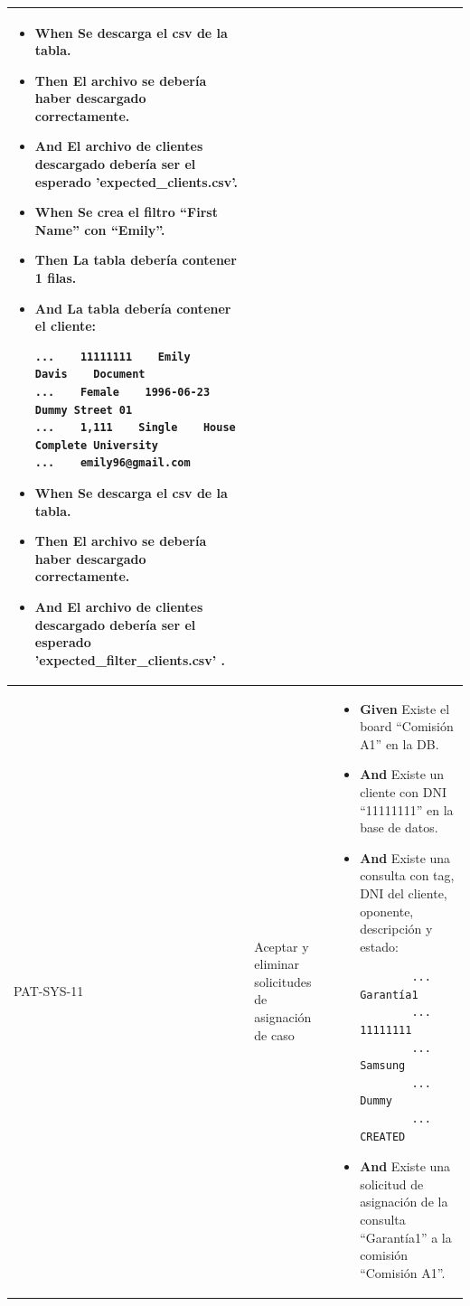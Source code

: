 \begin{longtable}{|p{1cm}|p{2.5cm}|p{12cm}|}
\begin{itemize}
\begin{verbatim}
...    22145685    John    Davis    Document    Female
...    1980-06-25  Dummy Street 01    1,111    Single
...    House  Complete University   john80@gmail.com
       \end{verbatim}
        \item \textbf{When} Se descarga el csv de la tabla.
        \item \textbf{Then} El archivo se debería haber descargado correctamente.
        \item \textbf{And} El archivo de clientes descargado debería ser el esperado 'expected\_clients.csv'.
        \item \textbf{When} Se crea el filtro ``First Name'' con ``Emily''.
        \item \textbf{Then} La tabla debería contener 1 filas.
        \item \textbf{And} La tabla debería contener el cliente:
        \begin{verbatim}
...    11111111    Emily    Davis    Document
...    Female    1996-06-23  Dummy Street 01
...    1,111    Single    House   Complete University
...    emily96@gmail.com
       \end{verbatim}
       \item \textbf{When} Se descarga el csv de la tabla.
       \item \textbf{Then} El archivo se debería haber descargado correctamente.
        \item \textbf{And} El archivo de clientes descargado debería ser el esperado 'expected\_filter\_clients.csv'
.
    \end{itemize}
    \\
    \hline
    PAT-SYS-11 & Aceptar y eliminar solicitudes de asignación de caso &
    \begin{itemize}
        \item \textbf{Given} Existe el board ``Comisión A1'' en la DB.
        \item \textbf{And} Existe un cliente con DNI ``11111111'' en la base de datos.
        \item \textbf{And} Existe una consulta con tag, DNI del cliente, oponente, descripción y estado:
        \begin{verbatim}
        ...    Garantía1
        ...    11111111
        ...    Samsung
        ...    Dummy
        ...    CREATED
        \end{verbatim}
        \item \textbf{And} Existe una solicitud de asignación de la consulta ``Garant\'ia1'' a la comisión ``Comisión A1''.

\end{itemize}
\end{longtable}
